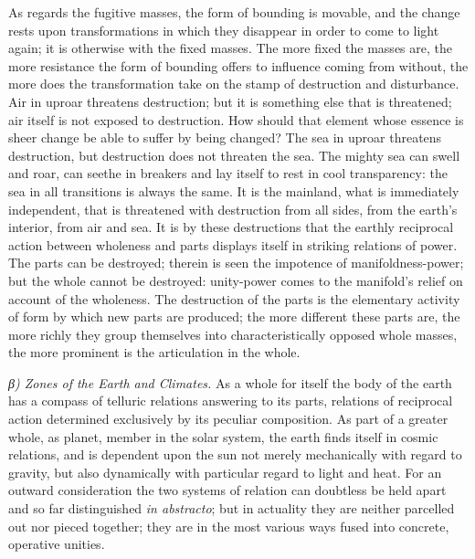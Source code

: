 \documentclass[12pt,a4paper]{book}
\newcommand{\subrunin}[1]{\emph{#1}\hspace{0.4em}}
\begin{document}
As regards the fugitive masses, the form of bounding is movable, and the change rests upon transformations in which they
disappear in order to come to light again; it is otherwise with the fixed masses. The more fixed the masses are, the more
resistance the form of bounding offers to influence coming from without, the more does the transformation take on the
stamp of destruction and disturbance. Air in uproar threatens destruction; but it is something else that is threatened;
air itself is not exposed to destruction. How should that element whose essence is sheer change be able to suffer by
being changed? The sea in uproar threatens destruction, but destruction does not threaten the sea. The mighty sea can
swell and roar, can seethe in breakers and lay itself to rest in cool transparency: the sea in all transitions is always
the same. It is the mainland, what is immediately independent, that is threatened with destruction from all sides, from
the earth's interior, from air and sea. It is by these destructions that the earthly reciprocal action between wholeness
and parts displays itself in striking relations of power. The parts can be destroyed; therein is seen the impotence of
manifoldness-power; but the whole cannot be destroyed: unity-power comes to the manifold's
relief on account of the wholeness. The destruction of the parts is the elementary activity of form by which new parts
are produced; the more different these parts are, the more richly they group themselves into characteristically opposed
whole masses, the more prominent is the articulation in the whole.

\subrunin{β) Zones of the Earth and Climates.} As a whole for itself the body of the earth has a compass of telluric
relations answering to its parts, relations of reciprocal action determined exclusively by its peculiar composition. As
part of a greater whole, as planet, member in the solar system, the earth finds itself in cosmic relations, and is
dependent upon the sun not merely mechanically with regard to gravity, but also dynamically with particular regard to
light and heat. For an outward consideration the two systems of relation can doubtless be held apart and so far
distinguished \textit{in abstracto}; but in actuality they are neither parcelled out nor pieced together; they are in the
most various ways fused into concrete, operative unities.
\end{document}
